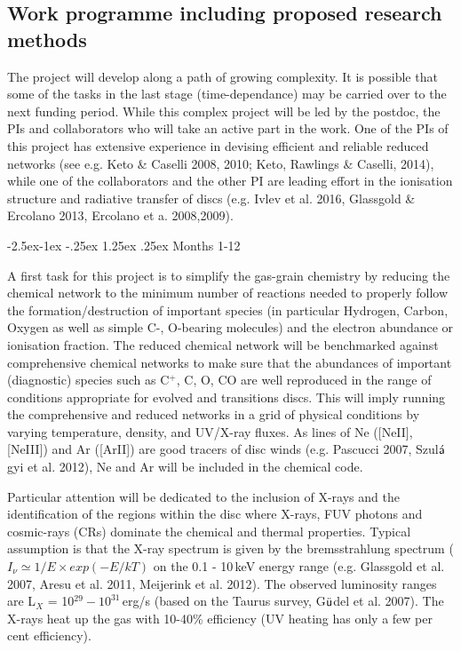 \documentclass[10pt,fleqn,twoside]{article}
\makeatletter
\newcommand{\Tcol}{\color{blue}}
\renewcommand\paragraph{\@startsection{paragraph}{4}{\z@}%
            {-2.5ex\@plus -1ex \@minus -.25ex}%
            {1.25ex \@plus .25ex}%
            {\normalfont\normalsize\bfseries}}
\makeatother
\begin{document}
\subsection{\Tcol Work programme including proposed research methods}


The project will develop along a path of growing complexity. It is possible that some of the tasks in the last stage (time-dependance) may be carried over to the next funding period. While this complex project will be led by the postdoc, the PIs and collaborators who will take an active part in the work. One of the PIs of this project has extensive experience in devising efficient and reliable reduced networks (see e.g.  Keto \& Caselli 2008, 2010; Keto, Rawlings \& Caselli, 2014), while one of the collaborators and the other PI are leading effort in the ionisation structure and radiative transfer of discs (e.g. Ivlev et al. 2016, Glassgold \& Ercolano 2013, Ercolano et a. 2008,2009).  

\paragraph{Months 1-12}

 A first task for this project is to simplify the gas-grain chemistry by reducing the chemical network to the minimum number of reactions needed to properly follow the formation/destruction of important species (in particular Hydrogen, Carbon, Oxygen as well as simple C-, O-bearing molecules) and the electron abundance or ionisation fraction. 
The reduced chemical network will be benchmarked against comprehensive chemical networks to make sure that the abundances of  important (diagnostic) species such as C$^+$, C, O, CO are well reproduced in the range of conditions appropriate for evolved and
transitions discs. This will imply running the comprehensive and reduced networks in a grid of physical conditions by varying temperature, density, and UV/X-ray fluxes.  As lines of Ne ([NeII], [NeIII]) and Ar ([ArII]) are good tracers of disc winds (e.g. Pascucci 2007, Szul$\acute{\textsf a}$gyi et al. 2012), Ne and Ar will be included in the chemical code. 

Particular attention will be dedicated to the inclusion of X-rays and the identification of the regions within the disc where X-rays, FUV photons and cosmic-rays (CRs) dominate the chemical and thermal properties. Typical assumption is that the X-ray spectrum is given by the bremsstrahlung spectrum ($I_{\nu} \simeq 1/E \times exp(-E/kT)$ on the 0.1 - 10\,keV energy range (e.g. Glassgold et al. 2007, Aresu et al. 2011, Meijerink et al. 2012). The observed luminosity ranges are L$_X$ = 10$^{29} - 10^{31}$\,erg/s (based on the Taurus survey, G$\ddot{\textsf u}$del et al. 2007). The X-rays heat up the gas with 10-40\% efficiency (UV heating has only a few per cent efficiency). 
\end{document}
